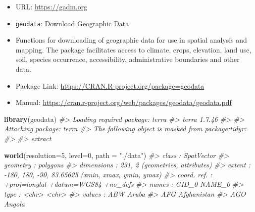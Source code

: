\documentclass[
  xelatex, ja=standard]{bxjsbook}
\newenvironment{Shaded}{\begin{snugshade}}{\end{snugshade}}
\newcommand{\AttributeTok}[1]{\textcolor[rgb]{0.13,0.29,0.53}{#1}}
\newcommand{\CommentTok}[1]{\textcolor[rgb]{0.56,0.35,0.01}{\textit{#1}}}
\newcommand{\DecValTok}[1]{\textcolor[rgb]{0.00,0.00,0.81}{#1}}
\newcommand{\FunctionTok}[1]{\textcolor[rgb]{0.13,0.29,0.53}{\textbf{#1}}}
\newcommand{\NormalTok}[1]{#1}
\newcommand{\StringTok}[1]{\textcolor[rgb]{0.31,0.60,0.02}{#1}}
\providecommand{\tightlist}{%
  \setlength{\itemsep}{0pt}\setlength{\parskip}{0pt}}
\theoremstyle{definition}
\theoremstyle{definition}
\theoremstyle{definition}
\theoremstyle{definition}
\theoremstyle{remark}
\begin{document}
\begin{itemize}
\tightlist
\item
  URL: \url{https://gadm.org}
\item
  \texttt{geodata}: Download Geographic Data
\item
  Functions for downloading of geographic data for use in spatial analysis and mapping. The package facilitates access to climate, crops, elevation, land use, soil, species occurrence, accessibility, administrative boundaries and other data.
\item
  Package Link: \url{https://CRAN.R-project.org/package=geodata}
\item
  Manual: \url{https://cran.r-project.org/web/packages/geodata/geodata.pdf}
\end{itemize}

\begin{Shaded}
\begin{Highlighting}[]
\FunctionTok{library}\NormalTok{(geodata)}
\CommentTok{\#\textgreater{} Loading required package: terra}
\CommentTok{\#\textgreater{} terra 1.7.46}
\CommentTok{\#\textgreater{} }
\CommentTok{\#\textgreater{} Attaching package: \textquotesingle{}terra\textquotesingle{}}
\CommentTok{\#\textgreater{} The following object is masked from \textquotesingle{}package:tidyr\textquotesingle{}:}
\CommentTok{\#\textgreater{} }
\CommentTok{\#\textgreater{}     extract}
\end{Highlighting}
\end{Shaded}

\begin{Shaded}
\begin{Highlighting}[]
\FunctionTok{world}\NormalTok{(}\AttributeTok{resolution=}\DecValTok{5}\NormalTok{, }\AttributeTok{level=}\DecValTok{0}\NormalTok{, }\AttributeTok{path =} \StringTok{"./data"}\NormalTok{)}
\CommentTok{\#\textgreater{}  class       : SpatVector }
\CommentTok{\#\textgreater{}  geometry    : polygons }
\CommentTok{\#\textgreater{}  dimensions  : 231, 2  (geometries, attributes)}
\CommentTok{\#\textgreater{}  extent      : {-}180, 180, {-}90, 83.65625  (xmin, xmax, ymin, ymax)}
\CommentTok{\#\textgreater{}  coord. ref. : +proj=longlat +datum=WGS84 +no\_defs }
\CommentTok{\#\textgreater{}  names       : GID\_0      NAME\_0}
\CommentTok{\#\textgreater{}  type        : \textless{}chr\textgreater{}       \textless{}chr\textgreater{}}
\CommentTok{\#\textgreater{}  values      :   ABW       Aruba}
\CommentTok{\#\textgreater{}                  AFG Afghanistan}
\CommentTok{\#\textgreater{}                  AGO      Angola}
\end{Highlighting}
\end{Shaded}
\end{document}
